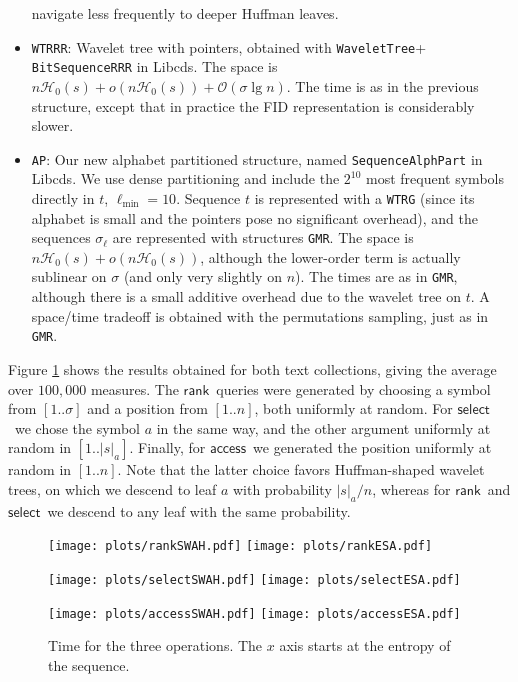 \documentclass[11pt]{article}
\newcommand{\Oh}[1]
    {\ensuremath{\mathcal{O}\left( {#1} \right)}}
\newcommand{\access}
    {\ensuremath{\mathsf{access}}}
\newcommand{\rank}
    {\ensuremath{\mathsf{rank}}}
\newcommand{\select}
    {\ensuremath{\mathsf{select}}}
\newcommand{\HH}{\mathcal{H}}
\newcommand{\Ho}{\HH_0}
\newcommand{\libcds}{{\sc Libcds}}
\begin{document}
\begin{itemize}
  navigate less frequently to deeper Huffman leaves.
\item \verb|WTRRR|: Wavelet tree with pointers, obtained with
  \verb|WaveletTree|+ \verb|BitSequenceRRR| in \libcds. The space is
  $n\Ho(s) + o(n\Ho(s)) + \Oh{\sigma\lg n}$. The time is as in the previous
  structure, except that in practice the FID representation is considerably
  slower.
\item \verb|AP|: Our new alphabet partitioned structure, named 
  \verb|SequenceAlphPart| in \libcds. We use dense partitioning and include
  the $2^{10}$ most frequent symbols directly in $t$, $\ell_\textrm{min}=10$. 
  Sequence $t$ is represented with a \verb|WTRG| (since its alphabet is small 
  and the pointers pose no significant overhead), and the sequences 
  $\sigma_\ell$ are represented with structures \verb|GMR|. The space is 
  $n\Ho(s)+o(n\Ho(s))$, although the lower-order term is actually sublinear on 
  $\sigma$ (and only
  very slightly on $n$). The times are as in \verb|GMR|, although there is a
  small additive overhead due to the wavelet tree on $t$. A space/time tradeoff
  is obtained with the permutations sampling, just as in \verb|GMR|.
\end{itemize}

Figure \ref{fig:opers} shows the results obtained for both text collections,
giving the average over $100{,}000$ measures. The \rank\ queries were generated
by choosing a symbol from $[1..\sigma]$ and a position from $[1..n]$, both
uniformly at random. For \select\ we chose the symbol $a$ in the same way, and
the other argument uniformly at random in $[1..|s|_a]$. Finally, for \access\ 
we generated the position uniformly at random in $[1..n]$. Note that the latter
choice favors Huffman-shaped wavelet trees, on which we descend to leaf $a$ with
probability $|s|_a/n$, whereas for \rank\ and \select\ we descend to any leaf
with the same probability.

\begin{figure}
\centerline{\texttt{[image: plots/rankSWAH.pdf]}
\texttt{[image: plots/rankESA.pdf]}}

\centerline{\texttt{[image: plots/selectSWAH.pdf]}
\texttt{[image: plots/selectESA.pdf]}}

\centerline{\texttt{[image: plots/accessSWAH.pdf]}
\texttt{[image: plots/accessESA.pdf]}}

\caption{Time for the three operations. The $x$ axis starts at the entropy of the sequence.}
\label{fig:opers}
\end{figure}
\end{document}
